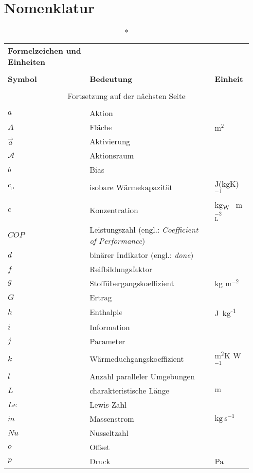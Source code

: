 \chapter*{Nomenklatur}
\begin{onehalfspacing}
\begin{longtable}[h]{p{} p{} p{}}
		\caption*{\textbf{Formelzeichen und Einheiten}} \\
		\\
		\textbf{Symbol} & \textbf{Bedeutung} & \textbf{Einheit} \\ %
		\endhead
		\\
		\multicolumn{3}{c}{Fortsetzung auf der nächsten Seite} \\
		\endfoot
		\multicolumn{3}{c}{ } \\
		\endlastfoot
		$a$& Aktion&\\
		$A$& Fläche&$\mathrm{m}^2$\\
		$\vec a$&Aktivierung&\\
		$\mathcal{A}$&Aktionsraum&\\
		$b$&Bias&\\		
		$c_\mathrm{p}$ & isobare Wärmekapazität&J(kgK)$^{-1}$\\
		$c$& Konzentration&\si{\kilogram}\textsubscript{W}~ \si{\meter}$_\mathrm{L}^{-3}$\\
		$COP$ & Leistungszahl (engl.: \textit{Coefficient of Performance})& \\
		$d$& binärer Indikator (engl.: \textit{done})&\\
		$f$&Reifbildungsfaktor&\\
		$g$& Stoffübergangskoeffizient&kg m$^{-2}$\\
		$G$& Ertrag&\\
		$h$ & Enthalpie&\si{J}~\si{\kg}\textsuperscript{-1}\\
		$i$& Information&\\
		$j$& Parameter&\\
		$k$&Wärmeduchgangskoeffizient&m$^2$K W$^{-1}$\\
		$l$& Anzahl paralleler Umgebungen&\\
		$L$& charakteristische Länge&$\si{\meter}$\\
		$Le$& Lewis-Zahl&\\
		$\dot{m}$& Massenstrom& $\si{\kilogram}~\si{\second}^{-1}$\\
		$Nu$& Nusseltzahl&\\
		$o$& Offset&\\
        $p$& Druck& \si{\pascal}\\	        

\end{longtable}
\end{onehalfspacing}
